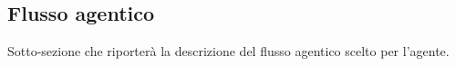 \subsection{Flusso agentico}

Sotto-sezione che riporterà la descrizione del flusso agentico scelto per l'agente.

